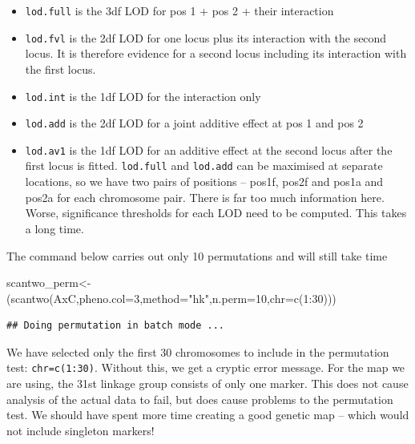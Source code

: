 \documentclass[
]{book}
\newenvironment{Shaded}{\begin{snugshade}}{\end{snugshade}}
\newcommand{\AttributeTok}[1]{\textcolor[rgb]{0.77,0.63,0.00}{#1}}
\newcommand{\DecValTok}[1]{\textcolor[rgb]{0.00,0.00,0.81}{#1}}
\newcommand{\FunctionTok}[1]{\textcolor[rgb]{0.00,0.00,0.00}{#1}}
\newcommand{\NormalTok}[1]{#1}
\newcommand{\OtherTok}[1]{\textcolor[rgb]{0.56,0.35,0.01}{#1}}
\newcommand{\SpecialCharTok}[1]{\textcolor[rgb]{0.00,0.00,0.00}{#1}}
\newcommand{\StringTok}[1]{\textcolor[rgb]{0.31,0.60,0.02}{#1}}
\providecommand{\tightlist}{%
  \setlength{\itemsep}{0pt}\setlength{\parskip}{0pt}}
\begin{document}
\begin{itemize}
\tightlist
\item
  \texttt{lod.full} is the 3df LOD for pos 1 + pos 2 + their interaction
\item
  \texttt{lod.fvl} is the 2df LOD for one locus plus its interaction with the second locus. It is therefore evidence for a second locus including its interaction with the first locus.
\item
  \texttt{lod.int} is the 1df LOD for the interaction only
\item
  \texttt{lod.add} is the 2df LOD for a joint additive effect at pos 1 and pos 2
\item
  \texttt{lod.av1} is the 1df LOD for an additive effect at the second locus after the first locus is fitted.
  \texttt{lod.full} and \texttt{lod.add} can be maximised at separate locations, so we have two pairs of positions -- pos1f, pos2f and pos1a and pos2a for each chromosome pair. There is far too much information here. Worse, significance thresholds for each LOD need to be computed. This takes a long time.
\end{itemize}

The command below carries out only 10 permutations and will still take time

\begin{Shaded}
\begin{Highlighting}[]
\NormalTok{scantwo\_perm}\OtherTok{\textless{}{-}}\NormalTok{(}\FunctionTok{scantwo}\NormalTok{(AxC,}\AttributeTok{pheno.col=}\DecValTok{3}\NormalTok{,}\AttributeTok{method=}\StringTok{"hk"}\NormalTok{,}\AttributeTok{n.perm=}\DecValTok{10}\NormalTok{,}\AttributeTok{chr=}\FunctionTok{c}\NormalTok{(}\DecValTok{1}\SpecialCharTok{:}\DecValTok{30}\NormalTok{))) }
\end{Highlighting}
\end{Shaded}

\begin{verbatim}
## Doing permutation in batch mode ...
\end{verbatim}

We have selected only the first 30 chromosomes to include in the permutation test: \texttt{chr=c(1:30)}. Without this, we get a cryptic error message. For the map we are using, the 31st linkage group consists of only one marker. This does not cause analysis of the actual data to fail, but does cause problems to the permutation test. We should have spent more time creating a good genetic map -- which would not include singleton markers!
\end{document}
